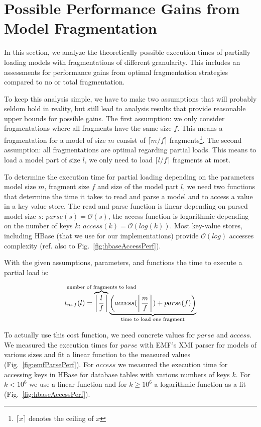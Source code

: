 \section{Possible Performance Gains from Model Fragmentation}
\label{sec:gains}

In this section, we analyze the theoretically possible execution times of partially loading models with fragmentations of different granularity. This includes an assessments for performance gains from optimal fragmentation strategies compared to no or total fragmentation.

To keep this analysis simple, we have to make two assumptions that will probably seldom hold in reality, but still lead to analysis results that provide reasonable upper bounds for possible gains.
The first assumption: we only consider fragmentations where all fragments have the same size $f$. 
This means a fragmentation for a model of size $m$ consist of $\lceil m/f \rceil$ fragments\footnote{$\lceil x\rceil$ denotes the ceiling of $x$}. 
The second assumption: all fragmentations are optimal regarding partial loads. This means to load a model part of size $l$, we only need to load $\lceil l/f\rceil$ fragments at most.

To determine the execution time for partial loading depending on the parameters model size $m$, fragment size $f$ and size of the model part $l$, we need two functions that determine the time it takes to read and parse a model and to access a value in a key value store. The read and parse function is linear depending on parsed model size $s$: $parse(s)=\mathcal{O}\left(s\right)$, the access function is logarithmic depending on the number of keys $k$: $access(k)=\mathcal{O}(log(k))$. Most key-value stores, including HBase (that we use for our implementations) provide $\mathcal{O}(log)$ accesses complexity (ref. also to Fig.~\ref{fig:hbaseAccessPerf}).

With the given assumptions, parameters, and functions the time to execute a partial load is:

$$t_{m,f}(l)=\overbrace{\left\lceil\frac{l}{f}\right\rceil}^{\mathclap{\text{number of fragments to load}}}\underbrace{\left(access(\left\lceil\frac{m}{f}\right\rceil) + parse(f)\right)}_{\mathclap{\text{time to load one fragment}}}$$

To actually use this cost function, we need concrete values for $parse$ and $access$. We measured the execution times for $parse$ with EMF's XMI parser for models of various sizes and fit a linear function to the measured values (Fig.~\ref{fig:emfParsePerf}). For $access$ we measured the execution time for accessing keys in HBase for database tables with various numbers of keys $k$. For $k<10^6$ we use a linear function and for $k\ge 10^6$ a logarithmic function as a fit (Fig.~\ref{fig:hbaseAccessPerf}). 

